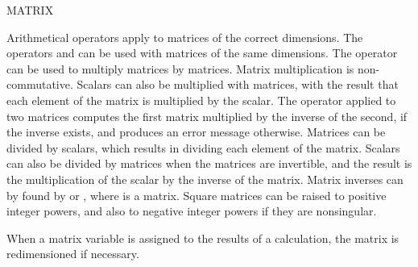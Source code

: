 \begin{Declaration}[matrix]{MATRIX}
\begin{Comments}
Arithmetical operators apply to matrices of the correct dimensions.  The
operators \name{+} and \name{-} can be used with matrices of the same
dimensions.  The operator \name{*} can be used to multiply
 matrices by 
matrices.  Matrix multiplication is non-commutative.  Scalars can also be
multiplied with matrices, with the result that each element of the matrix
is multiplied by the scalar.  The operator \name{/} applied to two
matrices computes the first matrix multiplied by the inverse of the
second, if the inverse exists, and produces an error message otherwise.
Matrices can be divided by scalars, which results in dividing each element
of the matrix.  Scalars can also be divided by matrices when the matrices
are invertible, and the result is the multiplication of the scalar by the
inverse of the matrix.  Matrix inverses can by found by  or
, where  is a matrix.  Square matrices can be raised to
positive integer powers, and also to negative integer powers if they are
nonsingular.

When a matrix variable is assigned to the results of a calculation, the
matrix is redimensioned if necessary.
\end{Comments}
\end{Declaration}



